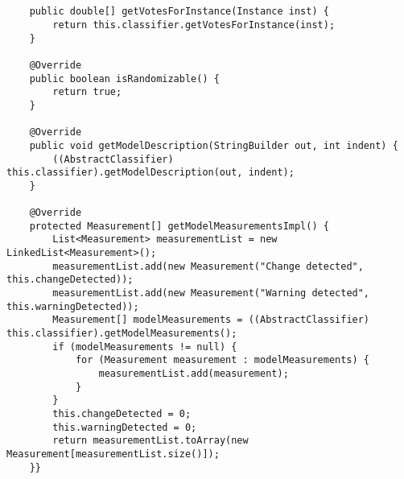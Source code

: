 \begin{lstlisting}[caption={Código em linguagem de programação Java do DDE2},label=dde2java]
   
    
    public double[] getVotesForInstance(Instance inst) {
        return this.classifier.getVotesForInstance(inst);
    }

    @Override
    public boolean isRandomizable() {
        return true;
    }

    @Override
    public void getModelDescription(StringBuilder out, int indent) {
        ((AbstractClassifier) this.classifier).getModelDescription(out, indent);
    }

    @Override
    protected Measurement[] getModelMeasurementsImpl() {
        List<Measurement> measurementList = new LinkedList<Measurement>();
        measurementList.add(new Measurement("Change detected", this.changeDetected));
        measurementList.add(new Measurement("Warning detected", this.warningDetected));
        Measurement[] modelMeasurements = ((AbstractClassifier) this.classifier).getModelMeasurements();
        if (modelMeasurements != null) {
            for (Measurement measurement : modelMeasurements) {
                measurementList.add(measurement);
            }
        }
        this.changeDetected = 0;
        this.warningDetected = 0;
        return measurementList.toArray(new Measurement[measurementList.size()]);
    }}



\end{lstlisting}


